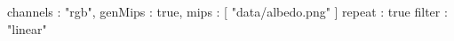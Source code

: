 {
	channels : "rgb",
	genMips : true,
	mips : [
		"data/albedo.png"
	]
	repeat : true
	filter : "linear"
}